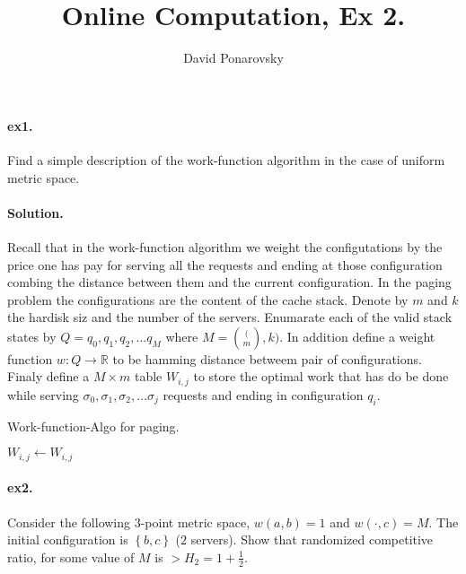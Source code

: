 \documentclass{article}
\newcommand{\expp}[1]{ \mathbf{E} \left[ {#1} \right]}
\begin{document}
\newcommand{\dalg}[1]{\expp{#1 : \text{alg} \sim \tilde{\text{alg}}}}
\newcommand{\dsig}[1]{\expp{#1 : \sigma \sim \tilde{\sigma}}}
\newcommand{\calg}{c_{\text{alg}}}
\newcommand{\cbase}{c_{\text{base}}}


\title{Online Computation, Ex 2. } 
\author{David Ponarovsky}
\maketitle

\begin{multicols*}{2}
  \paragraph{ex1.} Find a simple description of the work-function algorithm in the case of uniform metric space. 
  \paragraph{Solution.} Recall that in the work-function algorithm we weight the configutations by the price one has pay for serving all the requests and ending at those configuration combing the distance between them and the current configuration. In the paging problem the configurations are the content of the cache stack.  
  Denote by $m$ and $k$ the hardisk siz and the number of the servers. Enumarate each of the valid stack states by $Q = q_{0},q_{1},q_{2},\dots q_{M}$  where $M = \binom(m,k)$. In addition define a weight function $w : Q \rightarrow \mathbb{R}$ to be hamming distance betweem pair of configurations. Finaly define a $M \times m$ table $W_{i,j}$ to store the optimal work that has do be done while serving $\sigma_{0},\sigma_{1},\sigma_{2},\dots \sigma_{j}$ requests and ending in configuration $q_{i}$.     

  \begin{algorithm}[H]
    \caption{Work-function-Algo for paging.}
    \label{alg:three}
     {
       {
	$W_{i,j} \leftarrow W_{i,j}$ 
      }
    }
  \end{algorithm}
  \paragraph{ex2.} Consider the following $3$-point metric space, $w\left( a,b \right) = 1 $ and $w\left( \cdot, c  \right) = M $. The initial configuration is $ \left\{ b,c \right\}$ ($2$ servers). Show that randomized competitive ratio, for some value of $M$ is $ > H_{2} = 1 + \frac{1}{2}$. 

\end{multicols*}
\end{document}
